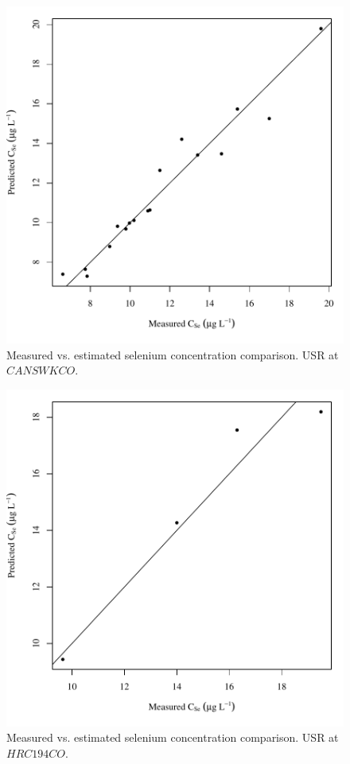 \begin{figure}[htbp]
	\begin{center}
	\includegraphics[width=6in]{"Figures/Results_USR/Conc Model pred v meas CAN"}
	\caption{Measured vs. estimated selenium concentration comparison.  USR at $CANSWKCO$.}
	\end{center}
\end{figure}
\newpage

\begin{figure}[htbp]
	\begin{center}
	\includegraphics[width=6in]{"Figures/Results_USR/Conc Model pred v meas HRC"}
	\caption{Measured vs. estimated selenium concentration comparison.  USR at $HRC194CO$.}
	\end{center}
\end{figure}
\newpage

